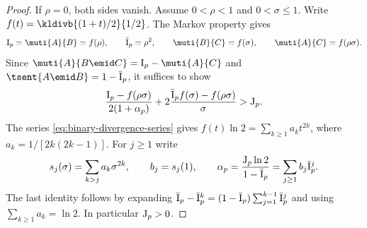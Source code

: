 \begin{proof}
If $\rho=0$, both sides vanish. Assume $0<\rho<1$ and $0<\sigma\le1$.
Write $f(t)=\kldivb{(1+t)/2}{1/2}$. The Markov property gives
\begin{align*}
 \sI=\muti{A}{B}=f(\rho),\qquad \qI=\rho^2,\qquad
 \muti{B}{C}=f(\sigma),\qquad \muti{A}{C}=f(\rho\sigma).
\end{align*}
Since $\muti{A}{B\emid C}=\sI-\muti{A}{C}$ and $\tsent{A\emid B}=1-\qI$,
it suffices to show
\begin{equation}
 \label{eq:three-bit-scalar-target}
 \frac{\mathrm{I}_p-f(\rho\sigma)}{2(1+\alpha_p)}
 +2\frac{\bar{\mathrm{I}}_p f(\sigma)-f(\rho\sigma)}{\sigma}>\mathrm{J}_p .
\end{equation}
The series \eqref{eq:binary-divergence-series} gives
$f(t)\ln2=\sum_{k\ge1}a_k t^{2k}$, where $a_k=1/[2k(2k-1)]$.
For $j\ge1$ write
\begin{equation*}
 s_j(\sigma)=\sum_{k>j}a_k\sigma^{2k},\qquad b_j=s_j(1),\qquad
 \alpha_p=\frac{\mathrm{J}_p\ln2}{1-\bar{\mathrm{I}}_p}=\sum_{j\ge1}b_j\bar{\mathrm{I}}_p^j .
\end{equation*}
The last identity follows by expanding
$\bar{\mathrm{I}}_p-\bar{\mathrm{I}}_p^k=(1-\bar{\mathrm{I}}_p)\sum_{j=1}^{k-1}\bar{\mathrm{I}}_p^j$ and using $\sum_{k\ge1}a_k=\ln2$.
In particular $\mathrm{J}_p>0$.


\end{proof}
